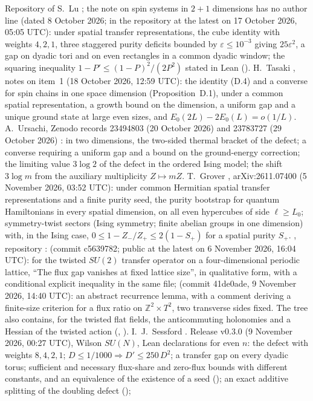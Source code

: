\documentclass[11pt,a4paper]{article}
\theoremstyle{plain}
\theoremstyle{definition}
\theoremstyle{remark}
\numberwithin{equation}{section}
\begin{document}
 Repository  of S.~Lu \cite{Lu26}; the note on spin systems in $2+1$ dimensions has no author line (dated 8 October 2026; in the repository at the latest on 17 October 2026, 05:05 UTC): under spatial transfer representations, the cube identity with weights $4,2,1$, three staggered purity deficits bounded by $\varepsilon\le10^{-3}$ giving $25\varepsilon^2$, a gap on dyadic tori and on even rectangles in a common dyadic window; the squaring inequality $1-P'\le(1-P)^2/(2P^2)$ stated in Lean ().
 H.~Tasaki \cite{Tas26}, notes on item~1 (18 October 2026, 12:59 UTC): the identity (D.4) and a converse for spin chains in one space dimension (Proposition~D.1), under a common spatial representation, a growth bound on the dimension, a uniform gap and a unique ground state at large even sizes, and $E_0(2L)-2E_0(L)=o(1/L)$.
 A.~Ursachi, Zenodo records 23494803 (20 October 2026) \cite{Urs26a} and 23783727 (29 October 2026) \cite{Urs26b}: in two dimensions, the two-sided thermal bracket of the defect; a converse requiring a uniform gap and a bound on the ground-energy correction; the limiting value $3\log2$ of the defect in the ordered Ising model; the shift $3\log m$ from the auxiliary multiplicity $Z\mapsto mZ$.
 T.~Grover \cite{Gro26}, arXiv:2611.07400 (5 November 2026, 03:52 UTC): under common Hermitian spatial transfer representations and a finite purity seed, the purity bootstrap for quantum Hamiltonians in every spatial dimension, on all even hypercubes of side $\ell\ge L_0$; symmetry-twist sectors (Ising symmetry; finite abelian groups in one dimension) with, in the Ising case, $0\le1-Z_-/Z_+\le2(1-S_+)$ for a spatial purity $S_+$.
 \cite{Tom26}, repository :  (commit c5639782; public at the latest on 6 November 2026, 16:04 UTC): for the twisted $SU(2)$ transfer operator on a four-dimensional periodic lattice, ``The flux gap vanishes at fixed lattice size'', in qualitative form, with a conditional explicit inequality in the same file;
 (commit 41de0ade, 9 November 2026, 14:40 UTC): an abstract recurrence lemma, with a comment deriving a finite-size criterion for a flux ratio on $\mathbb Z^2\times T^2$, two transverse sides fixed. The tree also contains, for the twisted flat fields, the anticommuting holonomies and a Hessian of the twisted action (, ).
 I.~J.~Sessford \cite{Ses26}. Release v0.3.0 (9 November 2026, 00:27 UTC), Wilson $SU(N)$, Lean declarations for even $n$: the defect with weights $8,4,2,1$; $D\le1/1000\Rightarrow D'\le250\,D^2$; a transfer gap on every dyadic torus; sufficient and necessary flux-share and zero-flux bounds with different constants, and an equivalence of the existence of a seed (); an exact additive splitting of the doubling defect ();
\end{document}
